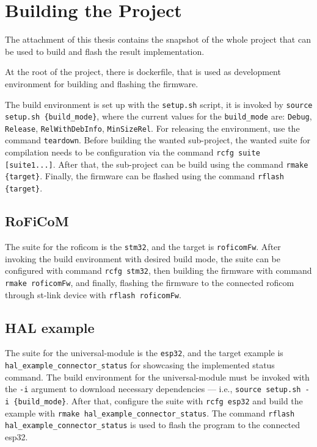 \documentclass[
  digital,     %
  oneside,     %
  nosansbold,  %
  nocolorbold, %
  nolof,         %
  nolot,         %
]{fithesis4}
\newcommand{\TODO}[1]{#1} %
\newcommand{\TODOLIST}[1]{}
\begin{document}
\appendix %
\chapter{Building the Project}

\TODOLIST{
\begin{itemize}
    \item Setup project --- dev env = docker
    \item source setup.sh $\rightarrow$ compile roficom, compile hal example
    \item flashing roficom
    \item flashing esp32
\end{itemize}
}

The attachment of this thesis contains the snapshot of the whole project that can be used to build
and flash the result implementation.

At the root of the project, there is dockerfile, that is used as development environment for
building and flashing the firmware.

The build environment is set up with the \texttt{setup.sh} script, it is invoked by \texttt{source
setup.sh \{build\_mode\}}, where the current values for the \texttt{build\_mode} are:
\texttt{Debug}, \texttt{Release}, \texttt{RelWithDebInfo}, \texttt{MinSizeRel}. For releasing the
environment, use the command \texttt{teardown}. Before building the wanted sub-project, the wanted
suite for compilation needs to be configuration via the command \texttt{rcfg suite [suite1...]}.
After that, the sub-project can be build using the command \texttt{rmake \{target\}}. Finally, the
firmware can be flashed using the command \texttt{rflash \{target\}}.

\section*{RoFiCoM}

The suite for the \acrshort{roficom} is the \texttt{stm32}, and the target is \texttt{roficomFw}.
After invoking the build environment with desired build mode, the suite can be configured with
command \texttt{rcfg stm32}, then building the firmware with command \texttt{rmake roficomFw}, and
finally, flashing the firmware to the connected \acrshort{roficom} through st-link device with
\texttt{rflash roficomFw}.

\section*{HAL example}

The suite for the \gls{universal-module} is the \texttt{esp32}, and the target example is
\texttt{hal\_example\_connector\_status} for showcasing the implemented status command. The build
environment for the \gls{universal-module} must be invoked with the \texttt{-i} argument to download
necessary dependencies --- i.e., \texttt{source setup.sh -i \{build\_mode\}}. After that, configure
the suite with \texttt{rcfg esp32} and build the example with \texttt{rmake
hal\_example\_connector\_status}. The command \texttt{rflash hal\_example\_connector\_status} is
used to flash the program to the connected esp32.
\end{document}
